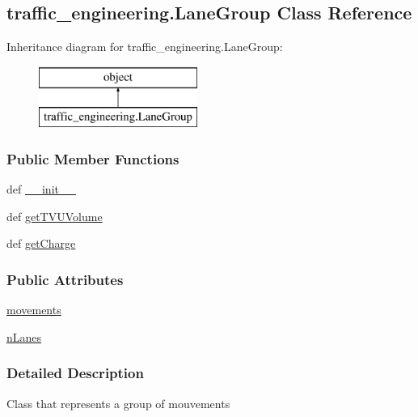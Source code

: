 \hypertarget{classtraffic__engineering_1_1LaneGroup}{\subsection{traffic\-\_\-engineering.\-Lane\-Group Class Reference}
\label{classtraffic__engineering_1_1LaneGroup}
}
Inheritance diagram for traffic\-\_\-engineering.\-Lane\-Group\-:\begin{figure}[H]
\begin{center}
\leavevmode
\includegraphics[height=2.000000cm]{classtraffic__engineering_1_1LaneGroup}
\end{center}
\end{figure}
\subsubsection*{Public Member Functions}
\begin{DoxyCompactItemize}
\item 
def \hyperlink{classtraffic__engineering_1_1LaneGroup_a1ec9c2c27c59cbe3b94aec4cd4149c97}{\-\_\-\-\_\-init\-\_\-\-\_\-}
\item 
def \hyperlink{classtraffic__engineering_1_1LaneGroup_a7046c83964c96e8c5e619363e5f8102b}{get\-T\-V\-U\-Volume}
\item 
def \hyperlink{classtraffic__engineering_1_1LaneGroup_a169b990761b6ea56563b6135dd129e80}{get\-Charge}
\end{DoxyCompactItemize}
\subsubsection*{Public Attributes}
\begin{DoxyCompactItemize}
\item 
\hyperlink{classtraffic__engineering_1_1LaneGroup_a96479716a1b5a03f2176a728d73c28a5}{movements}
\item 
\hyperlink{classtraffic__engineering_1_1LaneGroup_ad0a5c0cd3bdf8c1c38860ea81f8d3b2e}{n\-Lanes}
\end{DoxyCompactItemize}


\subsubsection{Detailed Description}
\begin{DoxyVerb}Class that represents a group of mouvements\end{DoxyVerb}
 

